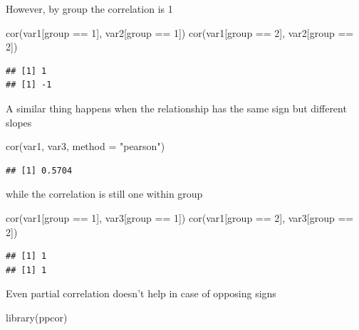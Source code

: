 \documentclass[
]{krantz}
\makeatletter
\newenvironment{Shaded}{\begin{snugshade}}{\end{snugshade}}
\newcommand{\AttributeTok}[1]{\textcolor[rgb]{0.61,0.61,0.61}{#1}}
\newcommand{\DecValTok}[1]{\textcolor[rgb]{0.06,0.06,0.06}{#1}}
\newcommand{\FunctionTok}[1]{\textcolor[rgb]{0,0,0}{#1}}
\newcommand{\NormalTok}[1]{#1}
\newcommand{\SpecialCharTok}[1]{\textcolor[rgb]{0,0,0}{#1}}
\newcommand{\StringTok}[1]{\textcolor[rgb]{0.5,0.5,0.5}{#1}}
\newenvironment{kframe}{%
\medskip{}
\setlength{\fboxsep}{.8em}
 \def\at@end@of@kframe{}%
 \ifinner\ifhmode%
  \def\at@end@of@kframe{\end{minipage}}%
  \begin{minipage}{\columnwidth}%
 \fi\fi%
 \def\FrameCommand##1{\hskip\@totalleftmargin \hskip-\fboxsep
 \colorbox{shadecolor}{##1}\hskip-\fboxsep
     \hskip-\linewidth \hskip-\@totalleftmargin \hskip\columnwidth}%
 \MakeFramed {\advance\hsize-\width
   \@totalleftmargin\z@ \linewidth\hsize
   \@setminipage}}%
 {\par\unskip\endMakeFramed%
 \at@end@of@kframe}
\renewenvironment{Shaded}{\begin{kframe}}{\end{kframe}}
\makeatother
\begin{document}
However, by group the correlation is 1

\begin{Shaded}
\begin{Highlighting}[]
\FunctionTok{cor}\NormalTok{(var1[group }\SpecialCharTok{==} \DecValTok{1}\NormalTok{], var2[group }\SpecialCharTok{==} \DecValTok{1}\NormalTok{])}
\FunctionTok{cor}\NormalTok{(var1[group }\SpecialCharTok{==} \DecValTok{2}\NormalTok{], var2[group }\SpecialCharTok{==} \DecValTok{2}\NormalTok{])}
\end{Highlighting}
\end{Shaded}

\begin{verbatim}
## [1] 1
## [1] -1
\end{verbatim}

A similar thing happens when the relationship has the same sign but different slopes

\begin{Shaded}
\begin{Highlighting}[]
\FunctionTok{cor}\NormalTok{(var1, var3, }\AttributeTok{method =} \StringTok{"pearson"}\NormalTok{)}
\end{Highlighting}
\end{Shaded}

\begin{verbatim}
## [1] 0.5704
\end{verbatim}

while the correlation is still one within group

\begin{Shaded}
\begin{Highlighting}[]
\FunctionTok{cor}\NormalTok{(var1[group }\SpecialCharTok{==} \DecValTok{1}\NormalTok{], var3[group }\SpecialCharTok{==} \DecValTok{1}\NormalTok{])}
\FunctionTok{cor}\NormalTok{(var1[group }\SpecialCharTok{==} \DecValTok{2}\NormalTok{], var3[group }\SpecialCharTok{==} \DecValTok{2}\NormalTok{])}
\end{Highlighting}
\end{Shaded}

\begin{verbatim}
## [1] 1
## [1] 1
\end{verbatim}

Even partial correlation doesn't help in case of opposing signs

\begin{Shaded}
\begin{Highlighting}[]
\FunctionTok{library}\NormalTok{(ppcor)}
\end{Highlighting}
\end{Shaded}
\end{document}

